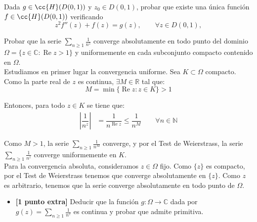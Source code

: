 \documentclass[12pt]{article}
\renewcommand{\Re}{\operatorname{Re}} %
\begin{document}
    \begin{ejercicio}[3.5 puntos]
        Dada $g\in \cc{H}(D(0,1))$ y $z_0\in D(0,1)$, probar que existe una única función $f\in \cc{H}(D(0,1))$ verificando
        \begin{equation*}
            z^2f''(z)+ f(z) = g(z),\qquad \forall z\in D(0,1),
        \end{equation*}
    \end{ejercicio}



    \newpage
    \setcounter{ejercicio}{0}



    \begin{ejercicio}[3.5 puntos]
        Probar que la serie $\sum\limits_{n \geq 1} \frac{1}{n^z}$ converge absolutamente en todo punto del dominio $\Omega = \{z \in \mathbb{C} : \Re z > 1\}$ y uniformemente en cada subconjunto compacto contenido en $\Omega$.\\


        Estudiamos en primer lugar la convergencia uniforme. Sea $K\subset \Omega$ compacto. Como la parte real de $z$ es continua, $\exists M\in \mathbb{R}$ tal que:
        \begin{equation*}
            M=\min\{\Re z : z\in K\} > 1
        \end{equation*}
        
        Entonces, para todo $z\in K$ se tiene que:
        \begin{align*}
            \left|\dfrac{1}{n^z}\right| &= \dfrac{1}{n^{\Re z}} \leq \dfrac{1}{n^M} \qquad \forall n\in \mathbb{N}
        \end{align*}

        Como $M> 1$, la serie $\displaystyle \sum_{n\geq 1} \frac{1}{n^M}$ converge, y por el Test de Weierstrass, la serie $\displaystyle \sum_{n\geq 1} \frac{1}{n^z}$ converge uniformemente en $K$.\\

        Para la convergencia absoluta, consideramos $z\in \Omega$ fijo. Como $\{z\}$ es compacto, por el Test de Weierstrass tenemos que converge absolutamente en $\{z\}$. Como $z$ es arbitrario, tenemos que la serie converge absolutamente en todo punto de $\Omega$.
    
        \begin{itemize}
            \item \textbf{[1 punto extra]} Deducir que la función $g : \Omega \to \mathbb{C}$ dada por $g(z)=\sum\limits_{n \geq 1} \frac{1}{n^z}$ es continua y probar que admite primitiva.
            

\end{itemize}
\end{ejercicio}
\end{document}
